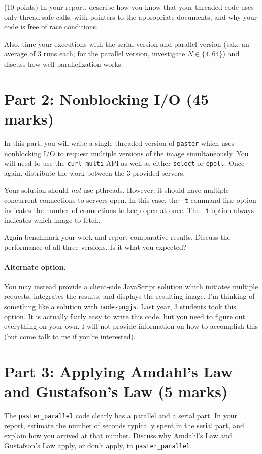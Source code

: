 \documentclass[letterpaper,10pt]{article}
\begin{document}
\vspace*{1em} \noindent (10 points) In your report, describe how you know that your threaded
code uses only thread-safe calls, with pointers to the appropriate
documents, and why your code is free of race conditions.

Also, time your executions with the serial version and parallel version 
(take an average of 3 runs each; for the parallel version, investigate $N \in \{4, 64\}$) and discuss how well parallelization works.

\section*{Part 2: Nonblocking I/O (45 marks)}

In this part, you will write a single-threaded version of {\tt paster}
which uses nonblocking I/O to request multiple versions of the image
simultaneously.  You will need to use the {\tt curl\_multi} API as
well as either {\tt select} or {\tt epoll}. Once again, distribute the
work between the 3 provided servers.

Your solution should \emph{not} use pthreads. However, it should have multiple
concurrent connections to servers open. In this case, the {\tt -t} command
line option indicates the number of connections to keep open at once.
The {\tt -i} option always indicates which image to fetch.

\vspace*{1em} Again benchmark your work and report comparative results.
Discuss the performance of all three versions. Is it what you expected?

\paragraph{Alternate option.} You
may instead provide a client-side JavaScript solution which
initiates multiple requests, integrates the results,
and displays the resulting image. I'm thinking of something like a
solution with {\tt node-pngjs}. Last year, 3 students took this option. It is actually fairly
easy to write this code, but you need to figure out everything on your own.
I will not provide information on how
to accomplish this (but come talk to me if you're
interested). 


\section*{Part 3: Applying Amdahl's Law and Gustafson's Law (5 marks)}
The {\tt paster\_parallel} code clearly has a parallel and a serial part.
In your report, estimate the number of seconds typically spent in the serial part,
and explain how you arrived at that number. Discuss why Amdahl's Law and Gustafson's Law
apply, or don't apply, to {\tt paster\_parallel}.
\end{document}
